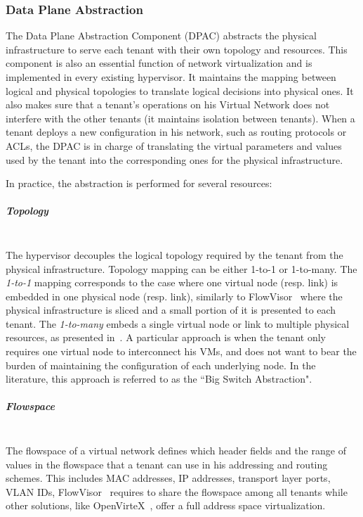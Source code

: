 \subsubsection{Data Plane Abstraction}
\label{sec:abstraction_comp}
The Data Plane Abstraction Component (DPAC) abstracts the physical infrastructure to serve each tenant with their own topology and resources.
This component is also an essential function of network virtualization and is implemented in every existing hypervisor.
It maintains the mapping between logical and physical topologies to translate logical decisions into physical ones.
It also makes sure that a tenant's operations on his Virtual Network does not interfere with the other tenants (\ie it maintains isolation between tenants). When a tenant deploys a new configuration in his network, such as routing protocols or ACLs, the DPAC is in charge of translating the virtual parameters and values used by the tenant into the corresponding ones for the physical infrastructure.

In practice, the abstraction is performed for several resources:

\subparagraph{\textbf{Topology}}\textbf{}\\
The hypervisor decouples the logical topology required by the tenant from the physical infrastructure.
Topology mapping can be either 1-to-1 or 1-to-many. 
The \textsl{1-to-1} mapping corresponds to the case where one virtual node (resp. link) is embedded in one physical node (resp. link), similarly to FlowVisor~\cite{FlowVisor-Sherwood2009} where the physical infrastructure is sliced and a small portion of it is presented to each tenant.
The \textsl{1-to-many} embeds a single virtual node or link to multiple physical resources, as presented in~\cite{OpenVirteX-Al-Shabibi2014,VeRTIGO-Corin2012a}.
A particular approach is when the tenant only requires one virtual node to interconnect his VMs, and does not want to bear the burden of maintaining the configuration of each underlying node. In the literature, this approach is referred to as the ``Big Switch Abstraction".


\subparagraph{\textbf{Flowspace}}\textbf{}\\
The flowspace of a virtual network defines which header fields and the range of values in the flowspace that a tenant can use in his addressing and routing schemes. This includes MAC addresses, IP addresses, transport layer ports, VLAN IDs, \etc
FlowVisor~\cite{FlowVisor-Sherwood2009} requires to share the flowspace among all tenants while other solutions, like OpenVirteX~\cite{OpenVirteX-Al-Shabibi2014}, offer a full address space virtualization.

